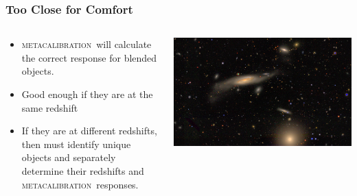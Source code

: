 \documentclass{beamer}
\newcommand{\mcal}{\textsc{metacalibration}}
\begin{document}
\frame
{
    \frametitle{Too Close for Comfort}
 
 
    \begin{columns}
        \begin{column}{0.5\textwidth}
            \begin{itemize}
                \item \mcal\ will calculate the correct response
                    for blended objects.
                \item Good enough if they are at the same redshift
                \item If they are at different redshifts, then must
                    identify unique objects and separately
                    determine their redshifts and \mcal\ responses.
            \end{itemize}
        \end{column}
        \begin{column}{0.5\textwidth}
            \begin{center}
                \includegraphics[width=1.2\textwidth, angle=90]{DES0056-5248_gri_crop.jpg}
            \end{center}
        \end{column}
    \end{columns}


}
\end{document}

